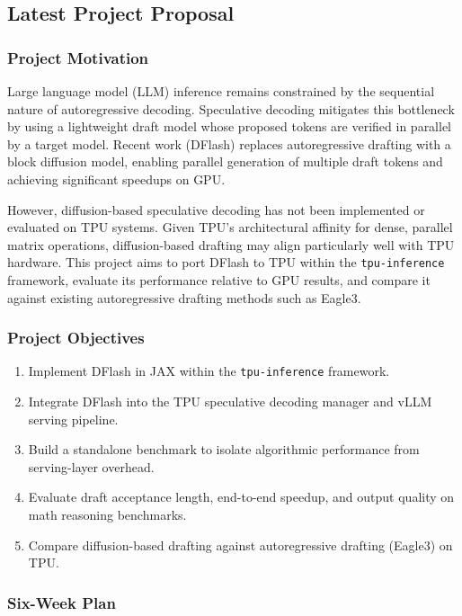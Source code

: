 \documentclass[12pt,letterpaper]{article}
\begin{document}
\subsection{Latest Project Proposal}

\subsubsection*{Project Motivation}

Large language model (LLM) inference remains constrained by the sequential nature of autoregressive decoding. Speculative decoding mitigates this bottleneck by using a lightweight draft model whose proposed tokens are verified in parallel by a target model. Recent work (DFlash) replaces autoregressive drafting with a block diffusion model, enabling parallel generation of multiple draft tokens and achieving significant speedups on GPU.

However, diffusion-based speculative decoding has not been implemented or evaluated on TPU systems. Given TPU’s architectural affinity for dense, parallel matrix operations, diffusion-based drafting may align particularly well with TPU hardware. This project aims to port DFlash to TPU within the \texttt{tpu-inference} framework, evaluate its performance relative to GPU results, and compare it against existing autoregressive drafting methods such as Eagle3.

\subsubsection*{Project Objectives}

\begin{enumerate}
    \item Implement DFlash in JAX within the \texttt{tpu-inference} framework.
    \item Integrate DFlash into the TPU speculative decoding manager and vLLM serving pipeline.
    \item Build a standalone benchmark to isolate algorithmic performance from serving-layer overhead.
    \item Evaluate draft acceptance length, end-to-end speedup, and output quality on math reasoning benchmarks.
    \item Compare diffusion-based drafting against autoregressive drafting (Eagle3) on TPU.
\end{enumerate}

\subsubsection*{Six-Week Plan}
\end{document}
